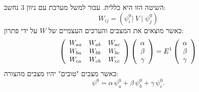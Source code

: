 \documentclass{tstextbook}
\begin{document}
\begin{remark}
השיטה הזו היא כללית. עבור למשל מערכת עם ניוון 3 נחשב:
$$W_{i j}=\left(\psi_{i}^{0}\left|\;V\;\right|\;\psi_{j}^{0}\right)$$
כאשר מוצאים את המצבים והערכים העצמיים של \(W\) על ידי פתרון:
$$\left(\begin{array}{c c c}{{W_{a a}}}&{{W_{a b}}}&{{W_{a c}}}\\ {{W_{b a}}}&{{W_{b b}}}&{{W_{b c}}}\\ {{W_{c a}}}&{{W_{c b}}}&{{W_{c c}}}\end{array}\right)\left(\begin{array}{c}{{\alpha}}\\ {{\beta}}\\ {{\gamma}}\end{array}\right)=E^{1}\left(\begin{array}{c}{{\alpha}}\\ {{\beta}}\\ {{\gamma}}\end{array}\right)$$
כאשר מצבים "טובים" יהיו מצבים מהצורה:
$$\psi^{0}=\alpha\,\psi_{a}^{0}+\beta\,\psi_{b}^{0}+\gamma\,\psi_{c}^{0}.$$

\end{remark}
\end{document}

